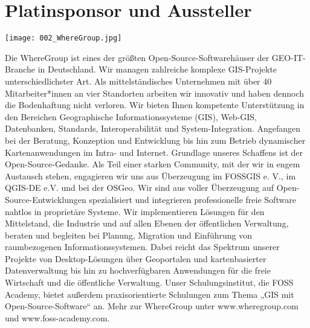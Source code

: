 \section*{Platinsponsor und Aussteller}

\vspace{-0.2cm}
\centerline{\texttt{[image: 002\_WhereGroup.jpg]}}
\small\noindent
Die WhereGroup ist eines der größten Open-Source-Software\-häuser der GEO-IT-Branche in Deutschland. Wir managen zahlreiche komplexe GIS-Projekte unterschiedlichster Art. Als mittelständisches Unternehmen mit über 40 Mitarbeiter*innen an vier Standorten arbeiten wir innovativ und haben dennoch die Bodenhaftung nicht verloren. Wir bieten Ihnen kompetente Unterstützung in den Bereichen Geographische Informationssysteme (GIS), Web-GIS, Datenbanken, Standards, Interoperabilität und System-Integration. Angefangen bei der Beratung, Konzeption und Entwicklung bis hin zum Betrieb dynamischer Kartenanwendungen im Intra- und Internet. Grundlage unseres Schaffens ist der Open-Source-Gedanke. Als Teil einer starken Community, mit der wir in engem Austausch stehen, engagieren wir uns aus Überzeugung im FOSSGIS e. V., im QGIS-DE e.V. und bei der OSGeo. Wir sind aus voller Überzeugung auf Open-Source-Entwicklungen spezialisiert und integrieren professionelle freie Software nahtlos in proprietäre Systeme. Wir implementieren Lösungen für den Mittelstand, die Industrie und auf allen Ebenen der öffentlichen Verwaltung, beraten und begleiten bei Planung, Migration und Einführung von raumbezogenen Informationssystemen. Dabei reicht das Spektrum unserer Projekte von Desktop-Lösungen über Geoportalen und kartenbasierter Datenverwaltung bis hin zu hochverfügbaren Anwendungen für die freie Wirtschaft und die öffentliche Verwaltung. Unser Schulungsinstitut, die FOSS Academy, bietet außerdem praxisorientierte Schulungen zum Thema „GIS mit Open-Source-Software“ an. Mehr zur WhereGroup unter www.wheregroup.com und www.foss-academy.com.
\normalsize
